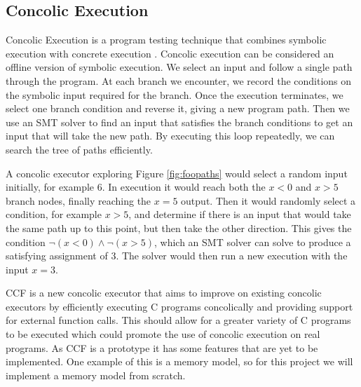 \documentclass[12pt,twoside]{report}
\begin{document}

\subsection{Concolic Execution}
Concolic Execution is a program testing technique that combines symbolic execution with concrete execution \cite{217563}.
Concolic execution can be considered an offline version of symbolic execution. We select an input and follow a single path through the program. At each branch we encounter, we record the conditions on the symbolic input required for the branch. Once the execution terminates, we select one branch condition and reverse it, giving a new program path. Then we use an SMT solver to find an input that satisfies the branch conditions to get an input that will take the new path. By executing this loop repeatedly, we can search the tree of paths efficiently.

A concolic executor exploring Figure \ref{fig:foopaths} would select a random input initially, for example 6. In execution it would reach both the $x < 0$ and $x > 5$ branch nodes, finally reaching the $x = 5$ output. Then it would randomly select a condition, for example $x > 5$, and determine if there is an input that would take the same path up to this point, but then take the other direction. This gives the condition $\neg(x < 0) \wedge \neg(x > 5)$, which an SMT solver can solve to produce a satisfying assignment of $3$. The solver would then run a new execution with the input $x = 3$.


CCF is a new concolic executor that aims to improve on existing concolic executors by efficiently executing C programs concolically and providing support for external function calls. This should allow for a greater variety of C programs to be executed which could promote the use of concolic execution on real programs. As CCF is a prototype it has some features that are yet to be implemented. One example of this is a memory model, so for this project we will implement a memory model from scratch.
\end{document}

